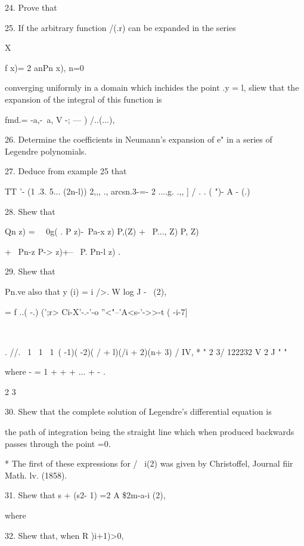 {{{{24. Prove that


25. If the arbitrary function /(.r) can be expanded in the series

X

f x)= 2 anPn x), n=0

converging uniformly in a domain which inchides the point .y = l,
sliew that the expansion of the integral of this function is

fmd.= -a,-\ a, V -; --- ) /..(...), 

26. Determine the coefficients in Neumann's expansion of e" in a
series of Legendre polynomials. 

27. Deduce from example 25 that

TT '- (1 .3. 5... (2n-l)) 2,,, ., arcsn.3-=- 2 ....g. .,, ] / . . (
")- A - (.)


28. Shew that

Qn z) = \ \ 0g( . P z)-\ Pa-x z) P,(Z) + \ P..., Z) P, Z)

+ \ Pn-z P-> z)+-- \ P. Pn-l z) .


29. Shew that

Pn.ve also that y (i) = i />. W log J - \, (2),

= f ..( -.) (';r> Ci-X'-.-'-o ''<"--'A<s-'->>-t ( -i-7]

\

. //. \ 1 \ 1 \ 1\ ( -1)( -2)( / + l)(/i + 2)(n+ 3) / IV, * " 2 3/
122232 V 2 J "  "

where - = 1 + + + ... + - . 

2 3

30. Shew that the complete solution of Legendre's differential
equation is

the path of integration being the straight line which when produced
backwards passes through the point =0.

* The first of these expressions for / \ i(2) was given by
Christoffel, Journal fiir Math. lv. (1858).

%
%

31. Shew that s + (s2- 1) =2 A \$2m-a-i (2),

where

32. Shew that, when R )i+1)>0,

}}}}

